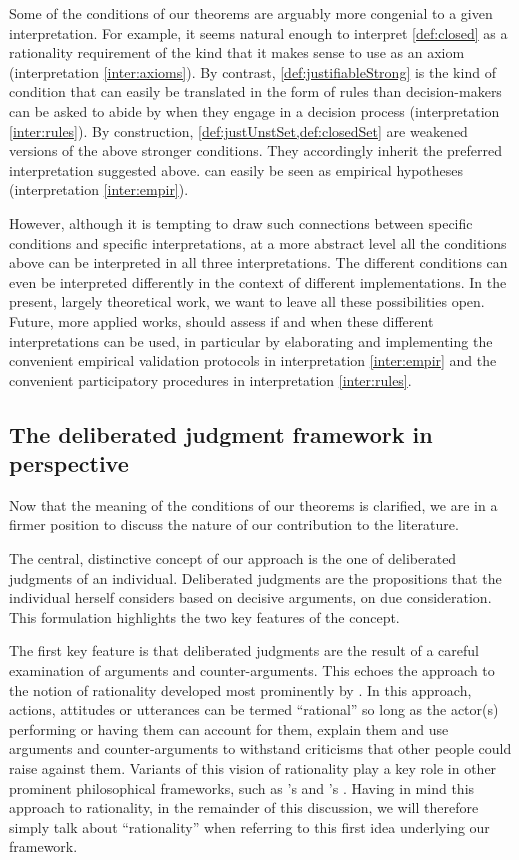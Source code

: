 \documentclass[smallextended,nospthms, natbib]{svjour3}
\begin{document}
Some of the conditions of our theorems are arguably more congenial to a given interpretation. For example, it seems natural enough to interpret \cref{def:closed} as a rationality requirement of the kind that it makes sense to use as an axiom (interpretation \ref{inter:axioms}). By contrast, \cref{def:justifiableStrong} is the kind of condition that can easily be translated in the form of rules than decision-makers can be asked to abide by when they engage in a decision process (interpretation \ref{inter:rules}). 
By construction, \cref{def:justUnstSet,def:closedSet}
are weakened versions of the above stronger conditions. They accordingly inherit the preferred interpretation suggested above.
 can easily be seen as empirical hypotheses (interpretation \ref{inter:empir}).

However, although it is tempting to draw such connections between specific conditions and specific interpretations, at a more abstract level all the conditions above can be interpreted in all three interpretations. The different conditions can even be interpreted differently in the context of different implementations. In the present, largely theoretical work, we want to leave all these possibilities open. Future, more applied works, should assess if and when these different interpretations can be used, in particular by elaborating and implementing the convenient empirical validation protocols in interpretation \ref{inter:empir} and the convenient participatory procedures in interpretation \ref{inter:rules}.

\subsection{The deliberated judgment framework in perspective}
\label{sec:pers}
Now that the meaning of the conditions of our theorems is clarified, we are in a firmer position to discuss the nature of our contribution to the literature.

The central, distinctive concept of our approach is the one of deliberated judgments of an individual. Deliberated judgments are the propositions that the individual herself considers based on decisive arguments, on due consideration. This formulation highlights the two key features of the concept.

	The first key feature is that deliberated judgments are the result of a careful examination of arguments and counter-arguments. This echoes the approach to the notion of rationality developed most prominently by \citet{habermas_theorie_1981}. In this approach, actions, attitudes or utterances can be termed “rational” so long as the actor(s) performing or having them can account for them, explain them and use arguments and counter-arguments to withstand criticisms that other people could raise against them. Variants of this vision of rationality play a key role in other prominent philosophical frameworks, such as \citeauthor{scanlon_what_2000}’s \citeyearpar{scanlon_what_2000} and \citeauthor{sen_idea_2009}’s \citeyearpar{sen_idea_2009}. Having in mind this approach to rationality, in the remainder of this discussion, we will therefore simply talk about “rationality” when referring to this first idea underlying our framework.
\end{document}
